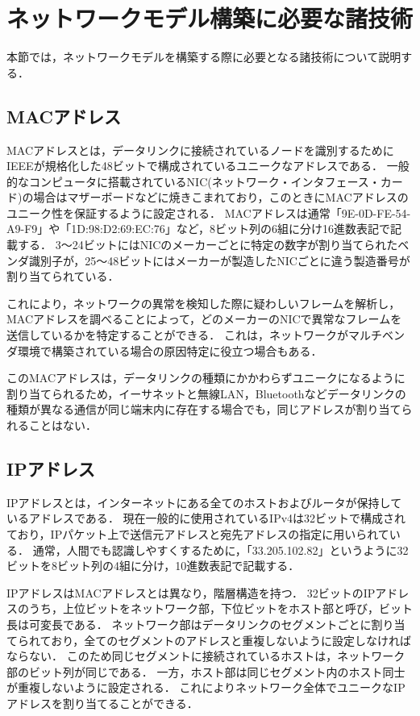 \section{ネットワークモデル構築に必要な諸技術}

本節では，ネットワークモデルを構築する際に必要となる諸技術について説明する．

\subsection{MACアドレス}

MACアドレスとは，データリンクに接続されているノードを識別するためにIEEEが規格化した48ビットで構成されているユニークなアドレスである\cite{masteringtcpip}．
一般的なコンピュータに搭載されているNIC(ネットワーク・インタフェース・カード)の場合はマザーボードなどに焼きこまれており，このときにMACアドレスのユニーク性を保証するように設定される．
MACアドレスは通常「9E-0D-FE-54-A9-F9」や「1D:98:D2:69:EC:76」など，8ビット列の6組に分け16進数表記で記載する．
3～24ビットにはNICのメーカーごとに特定の数字が割り当てられたベンダ識別子が，25～48ビットにはメーカーが製造したNICごとに違う製造番号が割り当てられている．

これにより，ネットワークの異常を検知した際に疑わしいフレームを解析し，MACアドレスを調べることによって，どのメーカーのNICで異常なフレームを送信しているかを特定することができる．
これは，ネットワークがマルチベンダ環境で構築されている場合の原因特定に役立つ場合もある．

このMACアドレスは，データリンクの種類にかかわらずユニークになるように割り当てられるため，イーサネットと無線LAN，Bluetoothなどデータリンクの種類が異なる通信が同じ端末内に存在する場合でも，同じアドレスが割り当てられることはない．

\subsection{IPアドレス}

IPアドレスとは，インターネットにある全てのホストおよびルータが保持しているアドレスである\cite{tanenbaum}．
現在一般的に使用されているIPv4は32ビットで構成されており，IPパケット上で送信元アドレスと宛先アドレスの指定に用いられている．
通常，人間でも認識しやすくするために，「33.205.102.82」というように32ビットを8ビット列の4組に分け，10進数表記で記載する．

IPアドレスはMACアドレスとは異なり，階層構造を持つ\cite{masteringtcpip}．
32ビットのIPアドレスのうち，上位ビットをネットワーク部，下位ビットをホスト部と呼び，ビット長は可変長である．
ネットワーク部はデータリンクのセグメントごとに割り当てられており，全てのセグメントのアドレスと重複しないように設定しなければならない．
このため同じセグメントに接続されているホストは，ネットワーク部のビット列が同じである．
一方，ホスト部は同じセグメント内のホスト同士が重複しないように設定される．
これによりネットワーク全体でユニークなIPアドレスを割り当てることができる．

